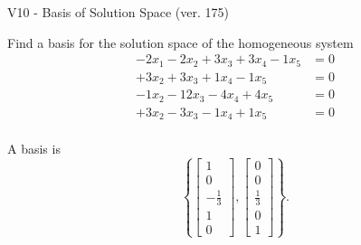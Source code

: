 \begin{exercise}
  \begin{exerciseTitle}V10 - Basis of Solution Space (ver. 175)\end{exerciseTitle}
  \begin{exerciseStatement}
    Find a basis for the solution space of the homogeneous system 
\begin{align*}
 -2 x_ 1 -2 x_ 2 + 3 x_ 3 + 3 x_ 4 -1 x_ 5 &= 0  \\ 
  + 3 x_ 2 + 3 x_ 3 + 1 x_ 4 -1 x_ 5 &= 0  \\ 
  -1 x_ 2 -12 x_ 3 -4 x_ 4 + 4 x_ 5 &= 0  \\ 
  + 3 x_ 2 -3 x_ 3 -1 x_ 4 + 1 x_ 5 &= 0  \\ 
 \end{align*}


 
  \end{exerciseStatement}

  \begin{exerciseAnswer}
   A basis is   
\[\left\{\left[\begin{array}{c}
1 \\
0 \\
-\frac{1}{3} \\
1 \\
0
\end{array}\right] , \left[\begin{array}{c}
0 \\
0 \\
\frac{1}{3} \\
0 \\
1
\end{array}\right]\right\}.\]

  


  \end{exerciseAnswer}
\end{exercise}